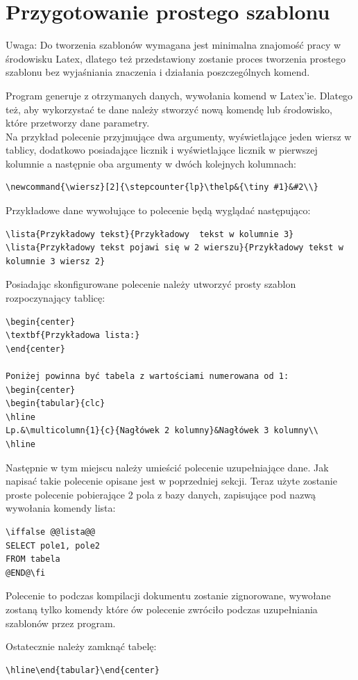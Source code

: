 \section{Przygotowanie prostego szablonu}

Uwaga: Do tworzenia szablonów wymagana jest minimalna znajomość pracy w środowisku Latex, dlatego też przedstawiony zostanie proces tworzenia prostego szablonu bez wyjaśniania znaczenia i działania poszczególnych komend.
\vspace{5mm}
\par Program generuje z otrzymanych danych, wywołania komend w Latex'ie. Dlatego też, aby wykorzystać te dane należy stworzyć nową komendę lub środowisko, które przetworzy dane parametry.\\ Na przykład polecenie przyjmujące dwa argumenty, wyświetlające jeden wiersz w tablicy, dodatkowo posiadające licznik i wyświetlające licznik w pierwszej kolumnie a następnie oba argumenty w dwóch kolejnych kolumnach:
\begin{lstlisting}
\newcommand{\wiersz}[2]{\stepcounter{lp}\thelp&{\tiny #1}&#2\\}
\end{lstlisting}

Przykładowe dane wywołujące to polecenie będą wyglądać następująco:
\begin{lstlisting}
\lista{Przykładowy tekst}{Przykładowy  tekst w kolumnie 3}
\lista{Przykładowy tekst pojawi się w 2 wierszu}{Przykładowy tekst w kolumnie 3 wiersz 2}
\end{lstlisting}

Posiadając skonfigurowane polecenie należy utworzyć prosty szablon rozpoczynający tablicę:
\begin{lstlisting}
\begin{center}
\textbf{Przykładowa lista:} 
\end{center}

Poniżej powinna być tabela z wartościami numerowana od 1:
\begin{center}
\begin{tabular}{clc}
\hline
Lp.&\multicolumn{1}{c}{Nagłówek 2 kolumny}&Nagłówek 3 kolumny\\
\hline
\end{lstlisting}

Następnie w tym miejscu należy umieścić polecenie uzupełniające dane. Jak napisać takie polecenie opisane jest w poprzedniej sekcji. Teraz użyte zostanie proste polecenie pobierające 2 pola z bazy danych, zapisujące pod nazwą wywołania komendy lista:
\begin{lstlisting}
\iffalse @@lista@@
SELECT pole1, pole2
FROM tabela
@END@\fi
\end{lstlisting}
Polecenie to podczas kompilacji dokumentu zostanie zignorowane, wywołane zostaną tylko komendy które ów polecenie zwróciło podczas uzupełniania szablonów przez program.
\par
Ostatecznie należy zamknąć tabelę:
\begin{lstlisting}
\hline\end{tabular}\end{center}
\end{lstlisting}


